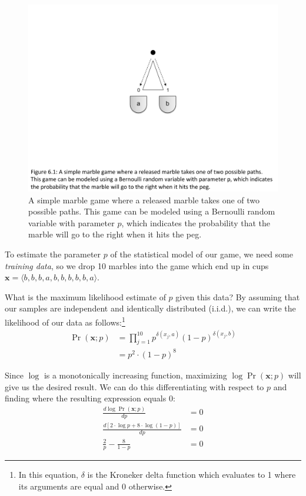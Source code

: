 \begin{figure}
\begin{center}
\includegraphics[scale=0.6]{figures/fig-ch6-em-marble1.pdf}
\end{center}\caption{A simple marble game where a released marble takes one of two possible paths.  This game can be modeled using a Bernoulli random variable with parameter $p$, which indicates the probability that the marble will go to the right when it hits the peg.}\label{chapter6_figure_plinko}
\end{figure}

To estimate the parameter $p$ of the statistical model of our game, we
need some \emph{training data}, so we drop 10 marbles into the game
which end up in cups $\textbf{x} = \langle
b,b,b,a,b,b,b,b,b,a\rangle$.

What is the maximum likelihood estimate of $p$ given this data?  By
assuming that our samples are independent and identically distributed
(i.i.d.), we can write the likelihood of our data as
follows:\footnote{In this equation, $\delta$ is the Kroneker delta
  function which evaluates to 1 where its arguments are equal and 0
  otherwise.}
\begin{align}
\Pr(\textbf{x};p) & = \prod_{j=1}^{10} p^{\delta(x_j,a)}(1-p)^{\delta(x_j,b)} \\
&  = p^2 \cdot (1 - p)^8
\end{align}

\noindent Since $\log$ is a monotonically increasing function,
maximizing $\log \Pr(\textbf{x};p)$ will give us the desired result.
We can do this differentiating with respect to $p$ and finding where
the resulting expression equals 0:
\begin{align}
\frac{d \log \Pr(\textbf{x};p)}{dp} & = 0\\
\frac{d [ 2\cdot \log p + 8 \cdot \log (1-p) ]}{dp} & = 0 \\
\frac{2}{p} - \frac{8}{1-p} & = 0
\end{align}

